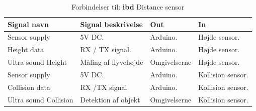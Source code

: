\begin{table}[H]
	\centering
		\begin{tabular}{|p{2.6 cm}|p{5.2 cm}|p{2.7 cm}|p{2.7 cm}|} 
		\hline
			\textbf{Signal navn} 	& \textbf{Signal beskrivelse}		& \textbf{Out} 				& \textbf{In}     \\ \hline
			Sensor supply 		& 5V DC.  				& Arduino. 			& Højde sensor.  \\ \hline
			Height data 		& RX / TX signal. 		& Arduino.			& Højde sensor.	\\ \hline
			Ultra sound \newline Height 	& Måling af flyvehøjde 	& Omgivelserne		& Højde sensor.	\\ \hline
			
			Sensor supply & 5V DC. & Arduino. & Kollision sensor.	\\ \hline
			Collision data & RX /TX signal & Arduino. & Kollision sensor.			    \\ \hline
			Ultra sound \newline Collision 	& Detektion af objekt	& Omgivelserne		& Kollision sensor.	\\ \hline
			
		\end{tabular}
	\caption{Forbindelser til: \textbf{ibd} Distance sensor}
	\label{tab:IBDDistancesensor}
\end{table}
